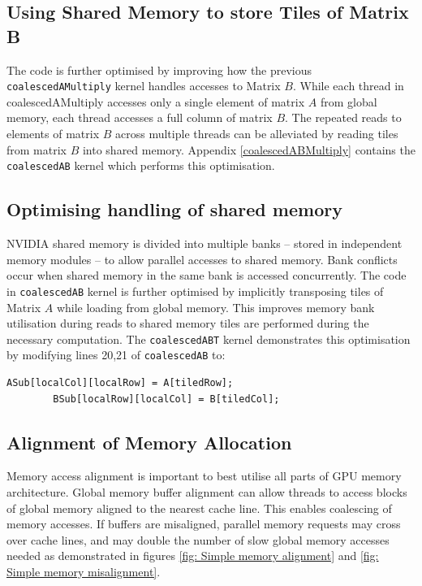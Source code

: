 \documentclass[review=false, sigchi]{acmart}
\begin{document}
	\subsection{Using Shared Memory to store Tiles of Matrix B} 
	
	The code is further optimised by improving how the previous \texttt{coalescedAMultiply} kernel handles accesses to Matrix $B$. While each thread in coalescedAMultiply accesses only a single element of matrix $A$ from global memory, each thread accesses a full column of matrix $B$. The repeated reads to elements of matrix $B$ across multiple threads can be alleviated by reading tiles from matrix $B$ into shared memory. Appendix \ref{coalescedABMultiply} contains the \texttt{coalescedAB} kernel which performs this optimisation.
	
	\subsection{Optimising handling of shared memory} 
	
	NVIDIA shared memory is divided into multiple banks -- stored in independent memory modules -- to allow parallel accesses to shared memory. Bank conflicts occur when shared memory in the same bank is accessed concurrently. The code in \texttt{coalescedAB} kernel is further optimised by implicitly transposing tiles of Matrix $A$ while loading from global memory. This improves memory bank utilisation during reads to shared memory tiles are performed during the necessary computation. The \texttt{coalescedABT} kernel demonstrates this optimisation by modifying lines 20,21 of \texttt{coalescedAB} to:
	
	\begin{lstlisting}[firstnumber=20]
		ASub[localCol][localRow] = A[tiledRow];
		BSub[localRow][localCol] = B[tiledCol];
	\end{lstlisting}
	
	
	\subsection{Alignment of Memory Allocation}
	
	Memory access alignment is important to best utilise all parts of GPU memory architecture. Global memory buffer alignment can allow threads to access blocks of global memory aligned to the nearest cache line. This enables coalescing of memory accesses. If buffers are misaligned, parallel memory requests may cross over cache lines, and may double the number of slow global memory accesses needed as demonstrated in figures \ref{fig: Simple memory alignment} and \ref{fig: Simple memory misalignment}.
	
\end{document}
